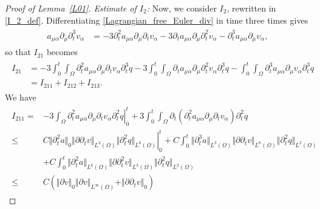 \documentclass[10pt,reqno]{amsart}
\makeatletter
\theoremstyle{plain}
\theoremstyle{definition}
\numberwithin{equation}{section}
\newcommand{\al}{\alpha}
\newcommand{\Om}{\Omega}
\newcommand{\norm}[1]{\Vert#1\Vert}
\def\paragraph{\@startsection{paragraph}{4}%
  \z@\z@{-\fontdimen2\font}%
  {\normalfont\it}}
\makeatother
\begin{document}
\begin{proof}[Proof of Lemma~\ref{L01}]
\emph{Estimate of $I_2$:}
Now, we consider $I_2$, rewritten in \eqref{I_2_def}. 
%
Differentiating \eqref{Lagrangian_free_Euler_div} in time three times gives
\begin{align}
\begin{split}
a_{\mu \al} \partial_\mu \partial^3_t v_\al 
& =
-3 \partial^2_t a_{\mu \al} \partial_\mu \partial_t v_\al
-3 \partial_t a_{\mu \al} \partial_\mu \partial^2_t v_\al 
- \partial^3_t a_{\mu \al} \partial_\mu v_\al,
\end{split}
\nonumber
\end{align}
so that $I_{21}$ becomes
\begin{align}
\begin{split}
I_{21}  &= 
-3 \int_0^t \int_\Om \partial^2_t a_{\mu \al} \partial_\mu \partial_t v_\al \partial^3_t q
- 3\int_0^t \int_\Om \partial_t a_{\mu \al} \partial_\mu \partial^2_t v_\al 
\partial^3_t q
- \int_0^t \int_\Om \partial^3_t a_{\mu \al} \partial_\mu v_\al\partial^3_t q
\\
& 
= I_{211} + I_{212} + I_{213}.
\end{split}
\label{I_21_break_up}
\end{align}
We have
\begin{align}
\begin{split}
I_{211}  = &
 \left. -3 \int_\Om 
\partial^2_t a_{\mu \al} \partial_\mu \partial_t v_\al \partial^2_t q
\right|_0^t 
+ 3 \int_0^t \int_\Om
\partial_t ( 
\partial^2_t a_{\mu \al} \partial_\mu \partial_t v_\al )
\partial^2_t q
\\
\leq  &
C \left. \norm{\partial^2_t a}_0 \norm{\partial \partial_t v}_{L^3(\Om)} 
\norm{\partial^2_t q}_{L^6(\Om)} \right|_0^t
+ C\int_0^t \norm{\partial^3_t a}_{L^3(\Om)}  \norm{\partial \partial_t v}_{L^6(\Om)}
\norm{\partial^2_t q}_{L^2(\Om)}
\\
&
+ C\int_0^t \norm{\partial^2_t a}_{L^6(\Om)} \norm{\partial \partial^2_t v}_{L^3(\Om)}
\norm{\partial^2_t q}_{L^2(\Om)}
\\
 \leq & 
 C \left. (\norm{\partial v}_0 \norm{\partial v}_{L^\infty(\Om)} + \norm{\partial \partial_t v}_0 )

\end{split}
\end{align}
\end{proof}
\end{document}
